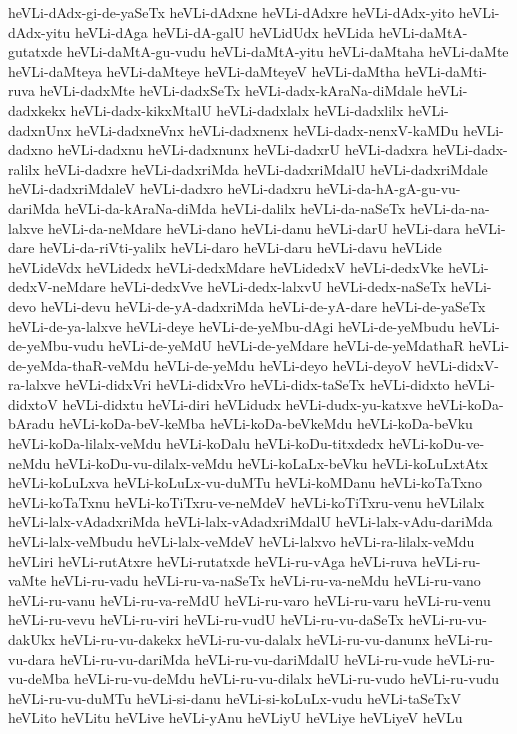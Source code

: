 {heVLi-dAdx-gi-de-yaSeTx
heVLi-dAdxne
heVLi-dAdxre
heVLi-dAdx-yito
heVLi-dAdx-yitu
heVLi-dAga
heVLi-dA-galU
heVLidUdx
heVLida
heVLi-daMtA-gutatxde
heVLi-daMtA-gu-vudu
heVLi-daMtA-yitu
heVLi-daMtaha
heVLi-daMte
heVLi-daMteya
heVLi-daMteye
heVLi-daMteyeV
heVLi-daMtha
heVLi-daMti-ruva
heVLi-dadxMte
heVLi-dadxSeTx
heVLi-dadx-kAraNa-diMdale
heVLi-dadxkekx
heVLi-dadx-kikxMtalU
heVLi-dadxlalx
heVLi-dadxlilx
heVLi-dadxnUnx
heVLi-dadxneVnx
heVLi-dadxnenx
heVLi-dadx-nenxV-kaMDu
heVLi-dadxno
heVLi-dadxnu
heVLi-dadxnunx
heVLi-dadxrU
heVLi-dadxra
heVLi-dadx-ralilx
heVLi-dadxre
heVLi-dadxriMda
heVLi-dadxriMdalU
heVLi-dadxriMdale
heVLi-dadxriMdaleV
heVLi-dadxro
heVLi-dadxru
heVLi-da-hA-gA-gu-vu-dariMda
heVLi-da-kAraNa-diMda
heVLi-dalilx
heVLi-da-naSeTx
heVLi-da-na-lalxve
heVLi-da-neMdare
heVLi-dano
heVLi-danu
heVLi-darU
heVLi-dara
heVLi-dare
heVLi-da-riVti-yalilx
heVLi-daro
heVLi-daru
heVLi-davu
heVLide
heVLideVdx
heVLidedx
heVLi-dedxMdare
heVLidedxV
heVLi-dedxVke
heVLi-dedxV-neMdare
heVLi-dedxVve
heVLi-dedx-lalxvU
heVLi-dedx-naSeTx
heVLi-devo
heVLi-devu
heVLi-de-yA-dadxriMda
heVLi-de-yA-dare
heVLi-de-yaSeTx
heVLi-de-ya-lalxve
heVLi-deye
heVLi-de-yeMbu-dAgi
heVLi-de-yeMbudu
heVLi-de-yeMbu-vudu
heVLi-de-yeMdU
heVLi-de-yeMdare
heVLi-de-yeMdathaR
heVLi-de-yeMda-thaR-veMdu
heVLi-de-yeMdu
heVLi-deyo
heVLi-deyoV
heVLi-didxV-ra-lalxve
heVLi-didxVri
heVLi-didxVro
heVLi-didx-taSeTx
heVLi-didxto
heVLi-didxtoV
heVLi-didxtu
heVLi-diri
heVLidudx
heVLi-dudx-yu-katxve
heVLi-koDa-bAradu
heVLi-koDa-beV-keMba
heVLi-koDa-beVkeMdu
heVLi-koDa-beVku
heVLi-koDa-lilalx-veMdu
heVLi-koDalu
heVLi-koDu-titxdedx
heVLi-koDu-ve-neMdu
heVLi-koDu-vu-dilalx-veMdu
heVLi-koLaLx-beVku
heVLi-koLuLxtAtx
heVLi-koLuLxva
heVLi-koLuLx-vu-duMTu
heVLi-koMDanu
heVLi-koTaTxno
heVLi-koTaTxnu
heVLi-koTiTxru-ve-neMdeV
heVLi-koTiTxru-venu
heVLilalx
heVLi-lalx-vAdadxriMda
heVLi-lalx-vAdadxriMdalU
heVLi-lalx-vAdu-dariMda
heVLi-lalx-veMbudu
heVLi-lalx-veMdeV
heVLi-lalxvo
heVLi-ra-lilalx-veMdu
heVLiri
heVLi-rutAtxre
heVLi-rutatxde
heVLi-ru-vAga
heVLi-ruva
heVLi-ru-vaMte
heVLi-ru-vadu
heVLi-ru-va-naSeTx
heVLi-ru-va-neMdu
heVLi-ru-vano
heVLi-ru-vanu
heVLi-ru-va-reMdU
heVLi-ru-varo
heVLi-ru-varu
heVLi-ru-venu
heVLi-ru-vevu
heVLi-ru-viri
heVLi-ru-vudU
heVLi-ru-vu-daSeTx
heVLi-ru-vu-dakUkx
heVLi-ru-vu-dakekx
heVLi-ru-vu-dalalx
heVLi-ru-vu-danunx
heVLi-ru-vu-dara
heVLi-ru-vu-dariMda
heVLi-ru-vu-dariMdalU
heVLi-ru-vude
heVLi-ru-vu-deMba
heVLi-ru-vu-deMdu
heVLi-ru-vu-dilalx
heVLi-ru-vudo
heVLi-ru-vudu
heVLi-ru-vu-duMTu
heVLi-si-danu
heVLi-si-koLuLx-vudu
heVLi-taSeTxV
heVLito
heVLitu
heVLive
heVLi-yAnu
heVLiyU
heVLiye
heVLiyeV
heVLu
}
